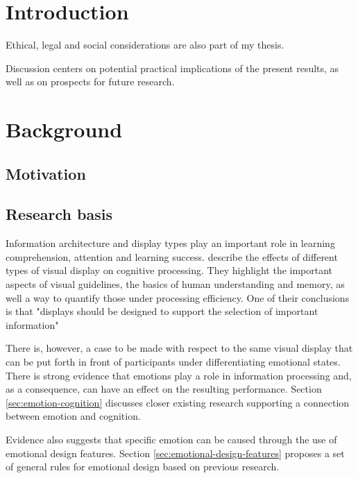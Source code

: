 \section{Introduction}




Ethical, legal and social considerations are also part of my thesis.


Discussion centers on potential practical implications of the present results, as well as on prospects for future research.

\clearpage

\section{Background}

	\subsection{Motivation}
	
	
	
		
	\subsection{Research basis} \label{sec:research}
	

	
	Information architecture and display types play an important role in learning comprehension, attention and learning success. \cite{McCrudden2017} describe the effects of different types of visual display on cognitive processing. They highlight the important aspects of visual guidelines, the basics of human understanding and  memory, as well a way to quantify those under processing efficiency. One of their conclusions is that "displays should be designed to support the selection of important information" \cite[p.633]{McCrudden2017}
	
	There is, however, a case to be made with respect to the same visual display that can be put forth in front of participants under differentiating emotional states. There is strong evidence that emotions play a role in information processing and, as a consequence, can have an effect on the resulting performance. Section \ref{sec:emotion-cognition} discusses closer existing research supporting a connection between emotion and cognition.
	
	Evidence also suggests that specific emotion can be caused through the use of emotional design features. Section \ref{sec:emotional-design-features} proposes a set of general rules for emotional design based on previous research.
	
